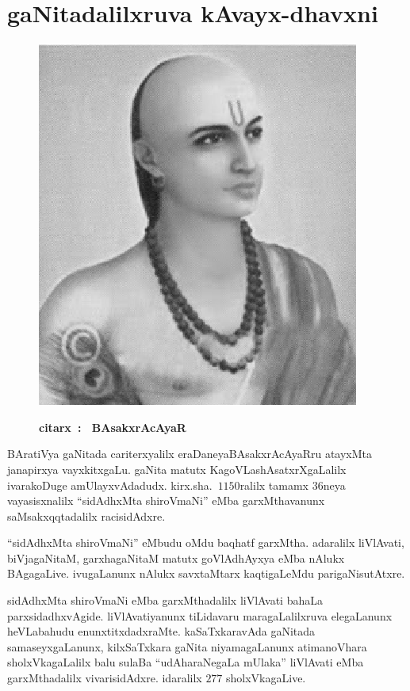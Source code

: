 \chapter{gaNitadalilxruva kAvayx-dhavxni}\label{chap13}

\begin{figure}
  \centering\includegraphics[scale=0.8]{src/figures/bhaskaracharya-II.eps}
  
  {\bf citarx~:~ BAsakxrAcAyaR}
    \end{figure}
    
BAratiVya gaNitada cariterxyalilx eraDaneya\break BAsakxrAcAyaRru atayxMta janapirxya vayxkitxgaLu.\- gaNita matutx KagoVLashAsatxrXgaLalilx ivara\break koDuge amUlayxvAdadudx. kirx.sha.\ $1150$ralilx tamamx $36$neya vayasisxnalilx ``sidAdhxMta shiroV\-maNi'' eMba garxMthavanunx saMsakxqqtadalilx racisidAdxre.

``sidAdhxMta shiroVmaNi'' eMbudu oMdu baqhatf garxMtha. adaralilx liVlAvati, biVjagaNitaM,\- garxhagaNitaM matutx goVlAdhAyxya eMba nAlukx BAgagaLive. ivugaLanunx nAlukx savxtaMtarx kaqtigaLeMdu parigaNisutAtxre.

sidAdhxMta shiroVmaNi eMba garxMthadalilx liVlAvati bahaLa parxsidadhxvAgide. liVlAvatiyanunx tiLidavaru maragaLalilxruva elegaLanunx heVLabahudu enunxtitxdadxraMte. kaSaTxkaravAda gaNitada samaseyxgaLanunx, kilxSaTxkara gaNita niyamagaLanunx atimanoVhara sholxVkagaLalilx balu sulaBa ``udAharaNegaLa mUlaka'' liVlAvati eMba garxMthadalilx vivarisidAdxre. idaralilx $277$ sholxVkagaLive.

